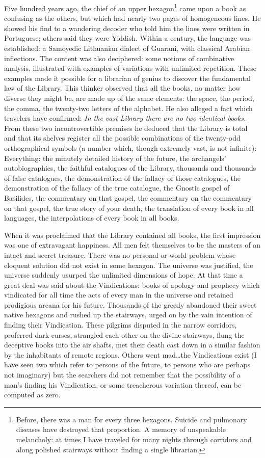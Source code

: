 \documentclass[oneside]{book}
\begin{document}
Five hundred years ago, the chief of an upper hexagon\footnote{Before, there was a man for every three hexagons. Suicide and pulmonary diseases have destroyed that proportion. A memory of unspeakable melancholy: at times I have traveled for many nights through corridors and along polished stairways without finding a single librarian.} came upon a book as confusing as the others, but which had nearly two pages of homogeneous lines. He showed his find to a wandering decoder who told him the lines were written in Portuguese; others said they were Yiddish. Within a century, the language was established: a Samoyedic Lithuanian dialect of Guarani, with classical Arabian inflections. The content was also deciphered: some notions of combinative analysis, illustrated with examples of variations with unlimited repetition. These examples made it possible for a librarian of genius to discover the fundamental law of the Library. This thinker observed that all the books, no matter how diverse they might be, are made up of the same elements: the space, the period, the comma, the twenty-two letters of the alphabet. He also alleged a fact which travelers have confirmed: \emph{In the vast Library there are no two identical books.} From these two incontrovertible premises he deduced that the Library is total and that its shelves register all the possible combinations of the twenty-odd orthographical symbols (a number which, though extremely vast, is not infinite): Everything: the minutely detailed history of the future, the archangels' autobiographies, the faithful catalogues of the Library, thousands and thousands of false catalogues, the demonstration of the fallacy of those catalogues, the demonstration of the fallacy of the true catalogue, the Gnostic gospel of Basilides, the commentary on that gospel, the commentary on the commentary on that gospel, the true story of your death, the translation of every book in all languages, the interpolations of every book in all books.

When it was proclaimed that the Library contained all books, the first impression was one of extravagant happiness. All men felt themselves to be the masters of an intact and secret treasure. There was no personal or world problem whose eloquent solution did not exist in some hexagon. The universe was justified, the universe suddenly usurped the unlimited dimensions of hope. At that time a great deal was said about the Vindications: books of apology and prophecy which vindicated for all time the acts of every man in the universe and retained prodigious arcana for his future. Thousands of the greedy abandoned their sweet native hexagons and rushed up the stairways, urged on by the vain intention of finding their Vindication. These pilgrims disputed in the narrow corridors, proferred dark curses, strangled each other on the divine stairways, flung the deceptive books into the air shafts, met their death cast down in a similar fashion by the inhabitants of remote regions. Others went mad\dots the Vindications exist (I have seen two which refer to persons of the future, to persons who are perhaps not imaginary) but the searchers did not remember that the possibility of a man's finding his Vindication, or some treacherous variation thereof, can be computed as zero.
\end{document}
